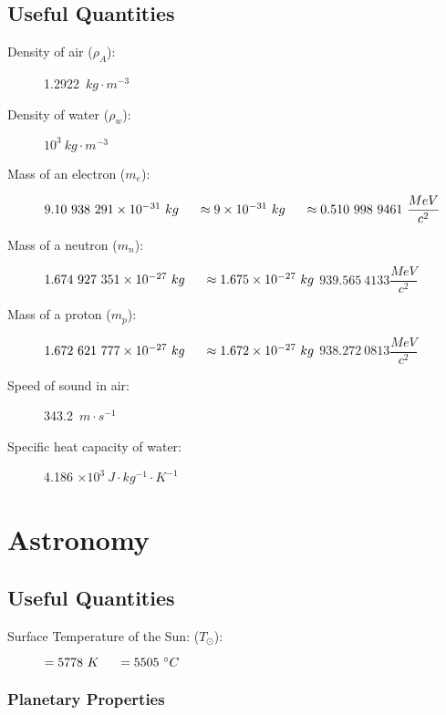 \subsection{Useful Quantities}
\begin{description}			
\item[Density of air ($\rho_A$):] 1.2922\ $kg \cdot m^{-3}$				
\item[Density of water ($\rho_w$):] $10^3\ kg \cdot m^{-3}$				
\item[Mass of an electron ($m_e$):] $ 9.10\ 938\ 291 \times 10^{-31}\ kg \tab[0.5cm] \approx  9 \times 10^{-31}\ kg \tab[0.5cm] \approx 0.510\ 998\ 9461\ \dfrac{MeV}{c^2} $
\item[Mass of a neutron ($m_n$):] $1.674\ 927\ 351 \times 10^{-27}\ kg \tab[0.5cm]\approx  1.675 \times 10^{-27}\ kg$				
\subitem \( 939.565\ 4133 \dfrac{MeV}{c^2} \)
\item[Mass of a proton ($m_p$):] $1.672\ 621\ 777 \times 10^{-27}\ kg \tab[0.5cm] \approx  1.672 \times 10^{-27}\ kg$					
\subitem \( 938.272\ 0813 \dfrac{MeV}{c^2} \)
\item[Speed of sound in air:] 343.2\ $m\cdot s^{-1}$				
\item[Specific heat capacity of water:] 4.186 $\times 10^3\ J \cdot kg^{-1} \cdot K^{-1}$
\end{description}


\clearpage

\section{Astronomy}


\subsection{Useful Quantities}
\begin{description}			

\item[Surface Temperature of the Sun: ($T_\odot$):] $= 5778\ K\tab[0.5cm]= 5505\ \degrees C$                   
\end{description}

\subsubsection{Planetary Properties}

